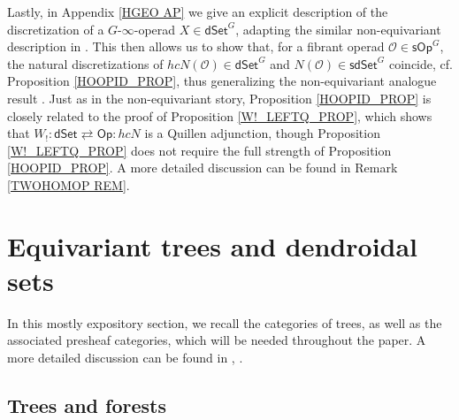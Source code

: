 \documentclass[a4paper,10pt]{article}%
\numberwithin{equation}{section}
\numberwithin{figure}{section}
\theoremstyle{definition} %
\renewcommand{\O}{\ensuremath{\mathcal O}}
\newcommand{\1}{\ensuremath{\mathbbm 1}}%
\begin{document}
Lastly, in Appendix \ref{HGEO AP}
we give an explicit description of the discretization of
a $G$-$\infty$-operad $X \in \mathsf{dSet}^G$,
adapting the similar non-equivariant description
in \cite[\S 6]{MW09}.
This then allows us to
show that,
for a fibrant operad
$\O \in \mathsf{sOp}^G$,
the natural discretizations of
$hcN(\O) \in \mathsf{dSet}^G$
and
$N(\O) \in \mathsf{sdSet}^G$
coincide, 
cf. Proposition \ref{HOOPID_PROP},
thus generalizing the non-equivariant analogue result
\cite[Prop. 4.8]{CM13b}.
Just as in the non-equivariant story,
Proposition \ref{HOOPID_PROP} is closely related
to the proof of 
Proposition \ref{W!_LEFTQ_PROP},
which shows that 
$W_! 
\colon 
\mathsf{dSet} 
\rightleftarrows 
\mathsf{Op}
\colon 
hcN$
is a Quillen adjunction,
though Proposition \ref{W!_LEFTQ_PROP}
does not require the full strength of 
Proposition \ref{HOOPID_PROP}.
A more detailed discussion can be found in 
Remark \ref{TWOHOMOP REM}.






\section{Equivariant trees and dendroidal sets}
\label{EQTRDS SEC}

In this mostly expository section, 
we recall the categories of trees,
as well as the associated presheaf categories,
which will be needed throughout the paper.
A more detailed discussion can be found in \cite{Per18}, \cite{BP_edss}.


\subsection{Trees and forests}
\label{FORESTS_SEC}
\end{document}
